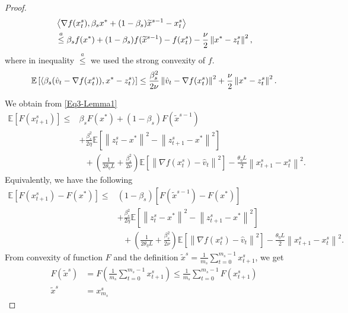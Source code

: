 \documentclass{article}
\newcommand*{\E}{\mathbb{E}}
\newcommand{\norm}[1]{\left\lVert#1\right\rVert}
\newcommand{\Iprod}[2]{\left\langle #1,#2\right\rangle}
\theoremstyle{definition}
\theoremstyle{remark}
\begin{document}
{\begin{proof}
\begin{equation}\label{Eq4-Lemma1}
\begin{split}
&\Iprod{\nabla f(x_{t}^s)}{\beta_sx^*+(1-\beta_s)\widetilde{x}^{s-1}-{x}^{s}_{t}}\\
&\stackrel{a}{\leq} \beta_sf(x^*)+(1-\beta_s)f(\widetilde{x}^{s-1})-f(x_{t}^s)-\frac{\nu}{2}\norm{x^*-z_t^s}^2,
\end{split}
\raisetag{15pt}
\end{equation}
where in inequality $\stackrel{a}{\leq}$ we used the strong convexity of $f$. 
\begin{equation}\label{Eq4-Lemma1}
\begin{split}
\E\left[\Iprod{\beta_s(\hat{v}_{t}-\nabla f(x_{t}^s))}{x^* - z_{t}^s}\right] \leq \frac{\beta_s^2}{2\nu} \norm{\hat{v}_{t}-\nabla f(x_{t}^s)}^2+\frac{\nu}{2}\norm{x^* - z_{t}^s}^2.
\end{split}
\raisetag{15pt}
\end{equation}

We obtain from \eqref{Eq3-Lemma1}
\begin{equation}
\begin{split}
\E[F(x_{t+1}^s)] \leq &\beta_s F(x^*)+(1-\beta_s)F(\widetilde{x}^{s-1})\\
&+ {\frac{\beta_s^2}{2\eta}}\E[\norm{z_{t}^s-x^*}^2-\norm{z_{t+1}^s-x^*}^2]\\
&~~~+(\frac{1}{2\theta_{\eta} L}+\frac{\beta_s^2}{2\nu})\E\left[\norm{\nabla f(x_{t}^s)-\hat{v}_{t}}^2\right]-\frac{\theta_{\eta} L}{2}\norm{x_{t+1}^s-x_{t}^s}^2. 
\end{split}
\end{equation}
Equivalently, we have the following
\begin{equation}\label{main-ine-Lemma1}
\begin{split}
\E[F(x_{t+1}^s)-F(x^*)] \leq &(1-\beta_s)[F(\widetilde{x}^{s-1})-F(x^*)] \\
&+ {\frac{ \beta_s^2}{2\eta}}\E[\norm{z_{t}^s-x^*}^2-\norm{z_{t+1}^s-x^*}^2]\\
&~~~+(\frac{1}{2\theta_{\eta} L}+\frac{\beta_s^2}{2\nu})\E\left[\norm{\nabla f(x_{t}^s)-\hat{v}_{t}}^2\right]-\frac{\theta_{\eta} L}{2}\norm{x_{t+1}^s-x_{t}^s}^2. 
\end{split}
\end{equation}
From convexity of function $F$ and the definition $\widetilde{x}^s = \frac{1}{m_s}\sum_{t=0}^{m_s-1}x_{t+1}^s$, we get 
\begin{equation}
\begin{split}
F(\widetilde{x}^s) &= F(\frac{1}{m_s}\sum_{t=0}^{m_s-1} x_{t+1}^s)\leq \frac{1}{m_s}\sum_{t=0}^{m_s-1}F(x_{t+1}^s)\\
\widetilde{x}^s &= x_{m_s}^s
\end{split}
\end{equation}


\end{proof}}
\end{document}
